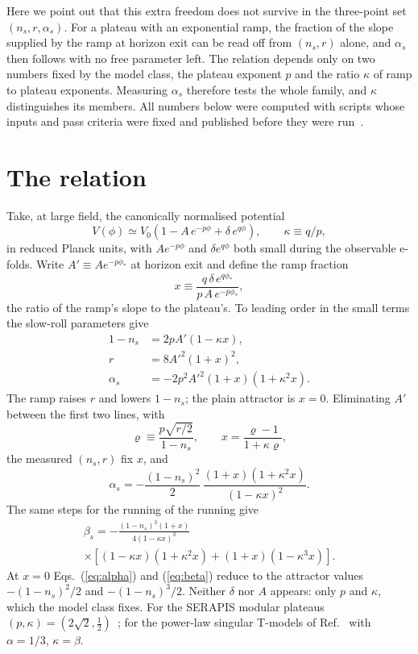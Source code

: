 \documentclass[aps,prd,twocolumn,superscriptaddress,nofootinbib,showkeys]{revtex4-2}
\begin{document}
Here we point out that this extra freedom does not survive in the three-point set $(n_s,r,\alpha_s)$. For a plateau with an exponential ramp, the fraction of the slope supplied by the ramp at horizon exit can be read off from $(n_s,r)$ alone, and $\alpha_s$ then follows with no free parameter left. The relation depends only on two numbers fixed by the model class, the plateau exponent $p$ and the ratio $\kappa$ of ramp to plateau exponents. Measuring $\alpha_s$ therefore tests the whole family, and $\kappa$ distinguishes its members. All numbers below were computed with scripts whose inputs and pass criteria were fixed and published before they were run~\cite{SERAPIS}.

\section{The relation}
Take, at large field, the canonically normalised potential
\begin{equation}
V(\phi)\simeq V_0\left(1-A\,e^{-p\phi}+\delta\,e^{q\phi}\right),\qquad \kappa\equiv q/p,
\label{eq:V}
\end{equation}
in reduced Planck units, with $A e^{-p\phi}$ and $\delta e^{q\phi}$ both small during the observable e-folds. Write $A'\equiv A e^{-p\phi_*}$ at horizon exit and define the ramp fraction
\begin{equation}
x\equiv\frac{q\,\delta\,e^{q\phi_*}}{p\,A\,e^{-p\phi_*}},
\end{equation}
the ratio of the ramp's slope to the plateau's. To leading order in the small terms the slow-roll parameters give
\begin{align}
1-n_s&=2pA'(1-\kappa x),\\
r&=8A'^2(1+x)^2,\\
\alpha_s&=-2p^2A'^2(1+x)(1+\kappa^2x).
\end{align}
The ramp raises $r$ and lowers $1-n_s$; the plain attractor is $x=0$. Eliminating $A'$ between the first two lines, with
\begin{equation}
\varrho\equiv\frac{p\sqrt{r/2}}{1-n_s},\qquad x=\frac{\varrho-1}{1+\kappa\varrho},
\label{eq:x}
\end{equation}
the measured $(n_s,r)$ fix $x$, and
\begin{equation}
\alpha_s=-\frac{(1-n_s)^2}{2}\,\frac{(1+x)(1+\kappa^2x)}{(1-\kappa x)^2}.
\label{eq:alpha}
\end{equation}
The same steps for the running of the running give
\begin{multline}
\beta_s=-\frac{(1-n_s)^3(1+x)}{4(1-\kappa x)^3}\\
\times\left[(1-\kappa x)(1+\kappa^2x)+(1+x)(1-\kappa^3x)\right].
\label{eq:beta}
\end{multline}
At $x=0$ Eqs.~(\ref{eq:alpha}) and (\ref{eq:beta}) reduce to the attractor values $-(1-n_s)^2/2$ and $-(1-n_s)^3/2$. Neither $\delta$ nor $A$ appears: only $p$ and $\kappa$, which the model class fixes. For the SERAPIS modular plateaus $(p,\kappa)=(2\sqrt2,\tfrac12)$~\cite{SERAPIS}; for the power-law singular T-models of Ref.~\cite{KL2025} with $\alpha=1/3$, $\kappa=\beta$.
\end{document}
